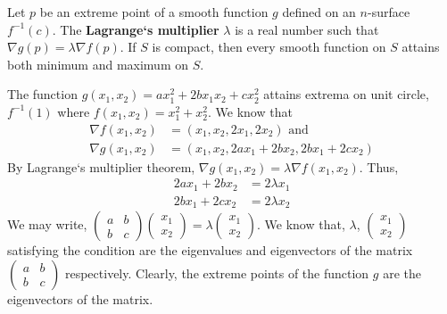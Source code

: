 \begin{remark}
	Let $p$ be an extreme point of a smooth function $g$ defined on an $n$-surface $f^{-1}(c)$.
	The \textbf{Lagrange`s multiplier} $\lambda$ is a real number such that $\nabla g(p) = \lambda \nabla f(p)$.
	If $S$ is compact, then every smooth function on $S$ attains both minimum and maximum on $S$.
\end{remark}

\begin{important}
	The function $g(x_1,x_2) = ax_1^2 + 2bx_1x_2 + cx_2^2$ attains extrema on unit circle, $f^{-1}(1)$ where $f(x_1,x_2) = x_1^2 + x_2^2$. We know that 
	\begin{align*}
		\nabla f(x_1,x_2) & = (x_1,x_2,2x_1,2x_2) \text{ and } \\
		\nabla g(x_1,x_2) & = (x_1,x_2,2ax_1+2bx_2,2bx_1+2cx_2)
	\end{align*}
	By Lagrange`s multiplier theorem, $\nabla g(x_1,x_2) = \lambda \nabla f(x_1,x_2)$. Thus,
	\begin{align*}
		2ax_1 +2bx_2 & = 2\lambda x_1 \\
		2bx_1 +2cx_2 & = 2\lambda x_2 
	\end{align*}
	We may write, $\begin{pmatrix}a & b \\ b & c \end{pmatrix} \begin{pmatrix} x_1 \\ x_2 \end{pmatrix} = \lambda \begin{pmatrix} x_1 \\ x_2 \end{pmatrix} $.
	We know that, $\lambda$, $\begin{pmatrix}x_1 \\ x_2 \end{pmatrix}$  satisfying the condition are the eigenvalues and eigenvectors of the matrix $\begin{pmatrix} a & b \\ b & c \end{pmatrix}$ respectively. Clearly, the extreme points of the function $g$ are the eigenvectors of the matrix.
\end{important}


